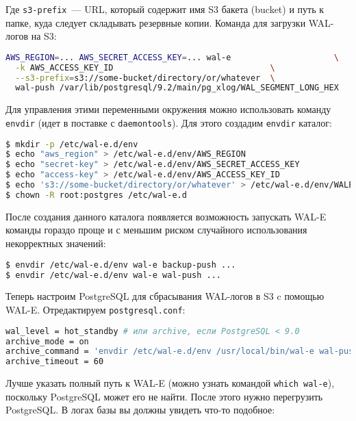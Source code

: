 Где \lstinline!s3-prefix!~--- URL, который содержит имя S3 бакета (bucket) и путь к папке, куда следует складывать резервные копии. Команда для загрузки WAL-логов на S3:

\begin{lstlisting}[language=Bash,label=lst:wal-e4,caption=Загрузка WAL-логов на S3]
AWS_REGION=... AWS_SECRET_ACCESS_KEY=... wal-e                     \
  -k AWS_ACCESS_KEY_ID                                \
  --s3-prefix=s3://some-bucket/directory/or/whatever  \
  wal-push /var/lib/postgresql/9.2/main/pg_xlog/WAL_SEGMENT_LONG_HEX
\end{lstlisting}

Для управления этими переменными окружения можно использовать команду \lstinline!envdir! (идет в поставке с \lstinline!daemontools!). Для этого создадим \lstinline!envdir! каталог:

\begin{lstlisting}[language=Bash,label=lst:wal-e5,caption=WAL-E с envdir]
$ mkdir -p /etc/wal-e.d/env
$ echo "aws_region" > /etc/wal-e.d/env/AWS_REGION
$ echo "secret-key" > /etc/wal-e.d/env/AWS_SECRET_ACCESS_KEY
$ echo "access-key" > /etc/wal-e.d/env/AWS_ACCESS_KEY_ID
$ echo 's3://some-bucket/directory/or/whatever' > /etc/wal-e.d/env/WALE_S3_PREFIX
$ chown -R root:postgres /etc/wal-e.d
\end{lstlisting}

После создания данного каталога появляется возможность запускать WAL-E команды гораздо проще и с меньшим риском случайного использования некорректных значений:

\begin{lstlisting}[language=Bash,label=lst:wal-e6,caption=WAL-E с envdir]
$ envdir /etc/wal-e.d/env wal-e backup-push ...
$ envdir /etc/wal-e.d/env wal-e wal-push ...
\end{lstlisting}

Теперь настроим PostgreSQL для сбрасывания WAL-логов в S3 c помощью WAL-E. Отредактируем \lstinline!postgresql.conf!:

\begin{lstlisting}[language=Bash,label=lst:wal-e7,caption=Настройка PostgreSQL]
wal_level = hot_standby # или archive, если PostgreSQL < 9.0
archive_mode = on
archive_command = 'envdir /etc/wal-e.d/env /usr/local/bin/wal-e wal-push %p'
archive_timeout = 60
\end{lstlisting}

Лучше указать полный путь к WAL-E (можно узнать командой \lstinline!which wal-e!), поскольку PostgreSQL может его не найти. После этого нужно перегрузить PostgreSQL. В логах базы вы должны увидеть что-то подобное:

